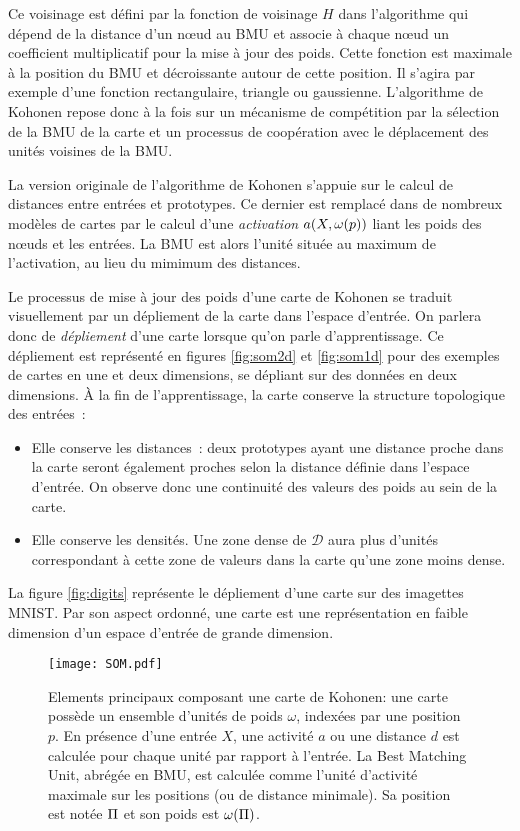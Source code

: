 \documentclass[../main]{subfiles}
\begin{document}
Ce voisinage est défini par la fonction de voisinage $H$ dans l'algorithme qui dépend de la distance d'un n\oe{}ud au BMU et associe à chaque n\oe{}ud un coefficient multiplicatif pour la mise à jour des poids. 
Cette fonction est maximale à la position du BMU et décroissante autour de cette position. Il s'agira par exemple d'une fonction rectangulaire, triangle ou gaussienne.
L'algorithme de Kohonen repose donc à la fois sur un mécanisme de compétition par la sélection de la BMU de la carte et un processus de coopération avec le déplacement des unités voisines de la BMU.

La version originale de l'algorithme de Kohonen s'appuie sur le calcul de distances entre entrées et prototypes. Ce dernier est remplacé dans de nombreux modèles de cartes par le calcul d'une \emph{activation} $a(X, \omega(p))$ liant les poids des n\oe{}uds et les entrées. La BMU est alors l'unité située au maximum de l'activation, au lieu du mimimum des distances.


Le processus de mise à jour des poids d'une carte de Kohonen se traduit visuellement par un dépliement de la carte dans l'espace d'entrée. On parlera donc de \emph{dépliement} d'une carte lorsque qu'on parle d'apprentissage. Ce dépliement est représenté en figures \ref{fig:som2d} et \ref{fig:som1d} pour des exemples de cartes en une et deux dimensions, se dépliant sur des données en deux dimensions.
\`A la fin de l'apprentissage, la carte conserve la structure topologique des entrées~:
\begin{itemize}
\item Elle conserve les distances~: deux prototypes ayant une distance proche dans la carte seront également proches selon la distance définie dans l'espace d'entrée. On observe donc une continuité des valeurs des poids au sein de la carte.
\item Elle conserve les densités. Une zone dense de $\mathcal{D}$ aura plus d'unités correspondant à cette zone de valeurs dans la carte qu'une zone moins dense.
\end{itemize}
La figure \ref{fig:digits} représente le dépliement d'une carte sur des imagettes MNIST.
Par son aspect ordonné, une carte est une représentation en faible dimension d'un espace d'entrée de grande dimension.

\begin{figure}
    \centering
    \texttt{[image: SOM.pdf]}
    \caption{Elements principaux composant une carte de Kohonen: une carte possède un ensemble d'unités de poids $\omega$, indexées par une position $p$. En présence d'une entrée $X$, une activité $a$ ou une distance $d$ est calculée pour chaque unité par rapport à l'entrée. La Best Matching Unit, abrégée en BMU, est calculée comme l'unité d'activité maximale sur les positions (ou de distance minimale). Sa position est notée $\Pi$ et son poids est $\omega(\Pi)$.\label{fig:SOM}}
    \end{figure}
\end{document}
